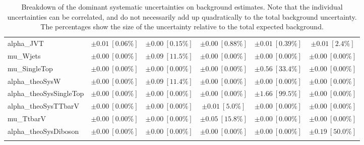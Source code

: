 \begin{sidewaystable}
\begin{center}
\begin{tabular*}{\textwidth}{@{\extracolsep{\fill}}lccccc}
alpha\_JVT         & $\pm 0.01\ [0.06\%] $          & $\pm 0.00\ [0.15\%] $          & $\pm 0.00\ [0.88\%] $          & $\pm 0.01\ [0.39\%] $          & $\pm 0.01\ [2.4\%] $       \\
mu\_Wjets         & $\pm 0.00\ [0.00\%] $          & $\pm 0.09\ [11.5\%] $          & $\pm 0.00\ [0.00\%] $          & $\pm 0.00\ [0.00\%] $          & $\pm 0.00\ [0.00\%] $       \\
mu\_SingleTop         & $\pm 0.00\ [0.00\%] $          & $\pm 0.00\ [0.00\%] $          & $\pm 0.00\ [0.00\%] $          & $\pm 0.56\ [33.4\%] $          & $\pm 0.00\ [0.00\%] $       \\
alpha\_theoSysW         & $\pm 0.00\ [0.00\%] $          & $\pm 0.09\ [11.4\%] $          & $\pm 0.00\ [0.00\%] $          & $\pm 0.00\ [0.00\%] $          & $\pm 0.00\ [0.00\%] $       \\
alpha\_theoSysSingleTop         & $\pm 0.00\ [0.00\%] $          & $\pm 0.00\ [0.00\%] $          & $\pm 0.00\ [0.00\%] $          & $\pm 1.66\ [99.5\%] $          & $\pm 0.00\ [0.00\%] $       \\
alpha\_theoSysTTbarV         & $\pm 0.00\ [0.00\%] $          & $\pm 0.00\ [0.00\%] $          & $\pm 0.01\ [5.0\%] $          & $\pm 0.00\ [0.00\%] $          & $\pm 0.00\ [0.00\%] $       \\
mu\_TtbarV         & $\pm 0.00\ [0.00\%] $          & $\pm 0.00\ [0.00\%] $          & $\pm 0.05\ [15.8\%] $          & $\pm 0.00\ [0.00\%] $          & $\pm 0.00\ [0.00\%] $       \\
alpha\_theoSysDiboson         & $\pm 0.00\ [0.00\%] $          & $\pm 0.00\ [0.00\%] $          & $\pm 0.00\ [0.00\%] $          & $\pm 0.00\ [0.00\%] $          & $\pm 0.19\ [50.0\%] $       \\
\noalign{\smallskip}\hline\noalign{\smallskip}
\end{tabular*}
\end{center}
\caption[Breakdown of uncertainty on background estimates]{
Breakdown of the dominant systematic uncertainties on background estimates.
Note that the individual uncertainties can be correlated, and do not necessarily add up quadratically to 
the total background uncertainty. The percentages show the size of the uncertainty relative to the total expected background.
\label{table.results.bkgestimate.uncertainties.SRC1_bybkg}}
\end{sidewaystable}
%